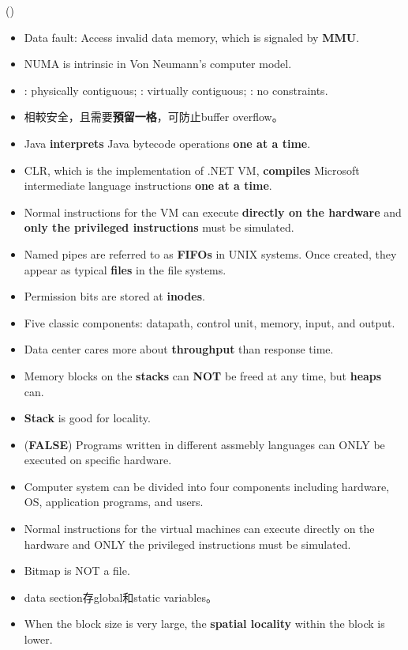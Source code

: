 \begin{theorem}{()} \quad\quad \begin{itemize}
        \item Data fault: Access invalid data memory, which is signaled by \textbf{MMU}.
        \item NUMA is intrinsic in Von Neumann's computer model.
        \item {}: physically contiguous; : virtually contiguous; : no constraints.
        \item {}相較安全，且需要\textbf{預留一格}，可防止buffer overflow。
        \item Java \textbf{interprets} Java bytecode operations \textbf{one at a time}.
        \item CLR, which is the implementation of .NET VM, \textbf{compiles} Microsoft intermediate language instructions \textbf{one at a time}.
        \item Normal instructions for the VM can execute \textbf{directly on the hardware} and \textbf{only the privileged instructions} must be simulated.
        \item Named pipes are referred to as \textbf{FIFOs} in UNIX systems. Once created, they appear as typical \textbf{files} in the file systems. 
        \item Permission bits are stored at \textbf{inodes}.
        \item Five classic components: datapath, control unit, memory, input, and output.
        \item Data center cares more about \textbf{throughput} than response time.
        \item Memory blocks on the \textbf{stacks} can \textbf{NOT} be freed at any time, but \textbf{heaps} can.
        \item \textbf{Stack} is good for locality.
        \item (\textbf{FALSE}) Programs written in different assmebly languages can ONLY be executed on specific hardware.
        \item Computer system can be divided into four components including hardware, OS, application programs, and users.  
        \item Normal instructions for the virtual machines can execute directly on the hardware and ONLY the privileged instructions must be simulated.
        \item Bitmap is NOT a file.
        \item data section存global和static variables。
        \item When the block size is very large, the \textbf{spatial locality} within the block is lower.
    \end{itemize}
\end{theorem}

